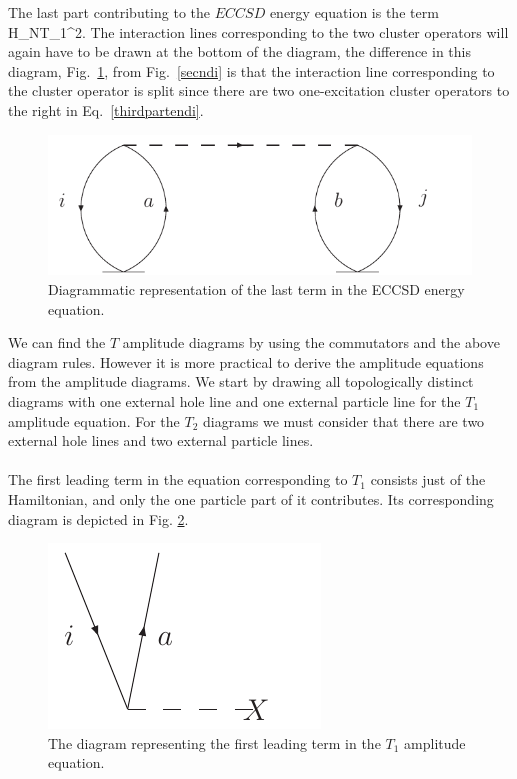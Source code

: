 The last part contributing to the $ECCSD$ energy equation is the
term 
\be
{}H_NT_1^2.
\label{thirdpartendi}
\ee
The interaction lines corresponding to the two cluster operators
will again have to be drawn at the bottom of the diagram, the 
difference in this diagram, Fig.~\ref{thirdenedi}, from 
Fig.~\ref{secndi} is that the 
interaction line corresponding to the cluster operator is 
split since there are two one-excitation cluster operators to
the right in Eq.~\eqref{thirdpartendi}. 
\begin{figure}[htp]
\centering
\includegraphics[scale=0.75]{thirdenedi}
\caption{Diagrammatic representation of the last term in the 
ECCSD energy equation.}
\label{thirdenedi}
\end{figure}
We can find the $T$ amplitude diagrams by using the commutators and the above diagram rules. However it is more practical to derive the amplitude equations from the amplitude diagrams. We start by
drawing all topologically distinct diagrams with  one external hole line and one external particle line for 
the $T_1$ amplitude equation. For the $T_2$ diagrams we must consider that there are two external hole 
lines and two external particle lines.\\
\\
The first leading term 
in the equation corresponding to $T_1$ consists just of the Hamiltonian, and 
only the one particle part of it contributes. Its corresponding diagram is
depicted in Fig. \ref{firstamplt1}.  
\begin{figure}[htp]
\centering
\includegraphics[scale=0.75]{firstampl}
\caption{The diagram representing the first leading term in the
$T_1$ amplitude equation.}
\label{firstamplt1}
\end{figure} 
